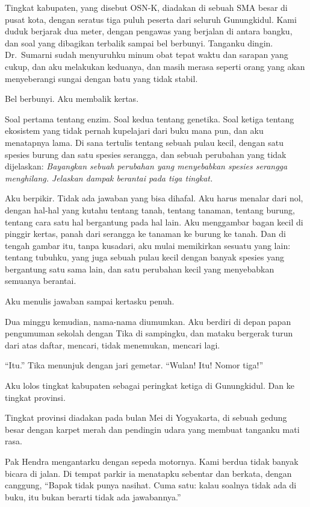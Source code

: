 \documentclass[11pt,twoside,openany]{book}
\makeatletter
\newcommand{\scenebreak}{\par\vspace{0.9em}{\centering\textsc{*\hspace{0.7em}*\hspace{0.7em}*}\par}\vspace{0.9em}\@afterindentfalse\@afterheading}
\makeatother
\begin{document}
Tingkat kabupaten, yang disebut OSN-K, diadakan di sebuah SMA besar di pusat kota, dengan seratus tiga puluh peserta dari seluruh Gunungkidul. Kami duduk berjarak dua meter, dengan pengawas yang berjalan di antara bangku, dan soal yang dibagikan terbalik sampai bel berbunyi. Tanganku dingin. Dr.~Sumarni sudah menyuruhku minum obat tepat waktu dan sarapan yang cukup, dan aku melakukan keduanya, dan masih merasa seperti orang yang akan menyeberangi sungai dengan batu yang tidak stabil.

Bel berbunyi. Aku membalik kertas.

Soal pertama tentang enzim. Soal kedua tentang genetika. Soal ketiga tentang ekosistem yang tidak pernah kupelajari dari buku mana pun, dan aku menatapnya lama. Di sana tertulis tentang sebuah pulau kecil, dengan satu spesies burung dan satu spesies serangga, dan sebuah perubahan yang tidak dijelaskan: \emph{Bayangkan sebuah perubahan yang menyebabkan spesies serangga menghilang. Jelaskan dampak berantai pada tiga tingkat.}

Aku berpikir. Tidak ada jawaban yang bisa dihafal. Aku harus menalar dari nol, dengan hal-hal yang kutahu tentang tanah, tentang tanaman, tentang burung, tentang cara satu hal bergantung pada hal lain. Aku menggambar bagan kecil di pinggir kertas, panah dari serangga ke tanaman ke burung ke tanah. Dan di tengah gambar itu, tanpa kusadari, aku mulai memikirkan sesuatu yang lain: tentang tubuhku, yang juga sebuah pulau kecil dengan banyak spesies yang bergantung satu sama lain, dan satu perubahan kecil yang menyebabkan semuanya berantai.

Aku menulis jawaban sampai kertasku penuh.

Dua minggu kemudian, nama-nama diumumkan. Aku berdiri di depan papan pengumuman sekolah dengan Tika di sampingku, dan mataku bergerak turun dari atas daftar, mencari, tidak menemukan, mencari lagi.

``Itu.'' Tika menunjuk dengan jari gemetar. ``Wulan! Itu! Nomor tiga!''

Aku lolos tingkat kabupaten sebagai peringkat ketiga di Gunungkidul. Dan ke tingkat provinsi.

\scenebreak
Tingkat provinsi diadakan pada bulan Mei di Yogyakarta, di sebuah gedung besar dengan karpet merah dan pendingin udara yang membuat tanganku mati rasa.

Pak Hendra mengantarku dengan sepeda motornya. Kami berdua tidak banyak bicara di jalan. Di tempat parkir ia menatapku sebentar dan berkata, dengan canggung, ``Bapak tidak punya nasihat. Cuma satu: kalau soalnya tidak ada di buku, itu bukan berarti tidak ada jawabannya.''
\end{document}
